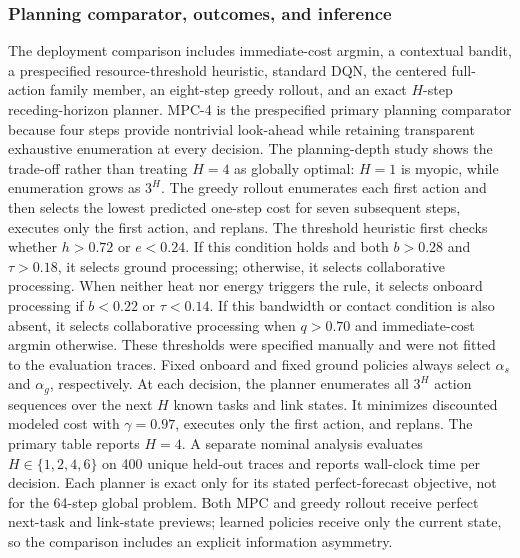 \documentclass[remotesensing,article,submit,moreauthors]{Definitions/mdpi}
\newenvironment{revisedblock}{\color{red}}{}
\newenvironment{revisedblock}{}{}
\begin{document}
\subsubsection{Planning comparator, outcomes, and inference}

\begin{revisedblock}
The deployment comparison includes immediate-cost argmin, a contextual bandit, a prespecified resource-threshold heuristic, standard DQN, the centered full-action family member, an eight-step greedy rollout, and an exact $H$-step receding-horizon planner. MPC-4 is the prespecified primary planning comparator because four steps provide nontrivial look-ahead while retaining transparent exhaustive enumeration at every decision. The planning-depth study shows the trade-off rather than treating $H=4$ as globally optimal: $H=1$ is myopic, while enumeration grows as $3^H$. The greedy rollout enumerates each first action and then selects the lowest predicted one-step cost for seven subsequent steps, executes only the first action, and replans. The threshold heuristic first checks whether $h>0.72$ or $e<0.24$. If this condition holds and both $b>0.28$ and $\tau>0.18$, it selects ground processing; otherwise, it selects collaborative processing. When neither heat nor energy triggers the rule, it selects onboard processing if $b<0.22$ or $\tau<0.14$. If this bandwidth or contact condition is also absent, it selects collaborative processing when $q>0.70$ and immediate-cost argmin otherwise. These thresholds were specified manually and were not fitted to the evaluation traces. Fixed onboard and fixed ground policies always select $\alpha_s$ and $\alpha_g$, respectively. At each decision, the planner enumerates all $3^H$ action sequences over the next $H$ known tasks and link states. It minimizes discounted modeled cost with $\gamma=0.97$, executes only the first action, and replans. The primary table reports $H=4$. A separate nominal analysis evaluates $H\in\{1,2,4,6\}$ on 400 unique held-out traces and reports wall-clock time per decision. Each planner is exact only for its stated perfect-forecast objective, not for the 64-step global problem. Both MPC and greedy rollout receive perfect next-task and link-state previews; learned policies receive only the current state, so the comparison includes an explicit information asymmetry.
\end{revisedblock}
\end{document}
